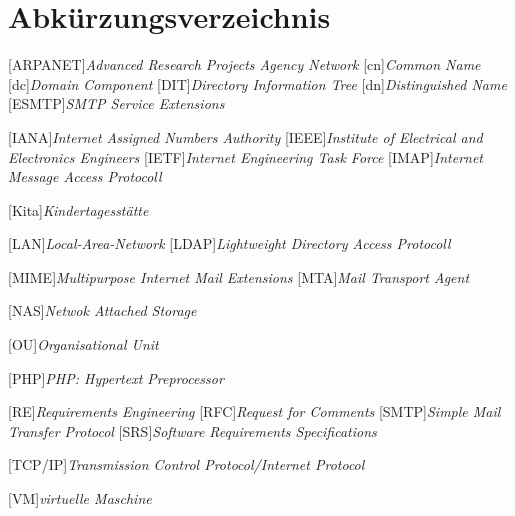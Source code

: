 
\chapter*{Abkürzungsverzeichnis}
\markboth{}{}

\begin{acronym}[]
[ARPANET]{\textit{Advanced Research Projects Agency Network}}
[cn]{\textit{Common Name}}
[dc]{\textit{Domain Component}}
[DIT]{\textit{Directory Information Tree}}
[dn]{\textit{Distinguished Name}}
[ESMTP]{\textit{SMTP Service Extensions}}



[IANA]{\textit{Internet Assigned Numbers Authority}}
[IEEE]{\textit{Institute of Electrical and Electronics Engineers}}
[IETF]{\textit{Internet Engineering Task Force}}
[IMAP]{\textit{Internet Message Access Protocoll}}


[Kita]{\textit{Kindertagesstätte}}

[LAN]{\textit{Local-Area-Network}}
[LDAP]{\textit{Lightweight Directory Access Protocoll}}

[MIME]{\textit{Multipurpose Internet Mail Extensions}}
[MTA]{\textit{Mail Transport Agent}}

[NAS]{\textit{Netwok Attached Storage}}

[OU]{\textit{Organisational Unit}}

[PHP]{\textit{PHP: Hypertext Preprocessor}}


[RE]{\textit{Requirements Engineering}}
[RFC]{\textit{Request for Comments}}
[SMTP]{\textit{Simple Mail Transfer Protocol}}
[SRS]{\textit{Software Requirements Specifications}}

[TCP/IP]{\textit{Transmission Control Protocol/Internet Protocol}}

[VM]{\textit{virtuelle Maschine}}








\end{acronym}